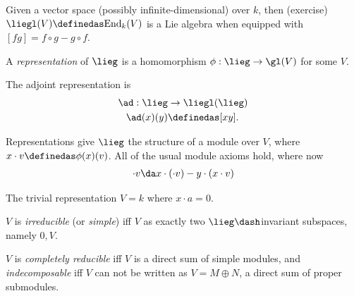 \begin{exercise}[?]

Given a vector space (possibly infinite-dimensional) over \(k\), then
(exercise) \(\liegl(V) \definedas \mathrm{End}_k(V)\) is a Lie algebra
when equipped with \([f g] = f\circ g - g\circ f\).

\end{exercise}

\begin{definition}[Representation]

A \emph{representation} of \(\lieg\) is a homomorphism
\(\phi: \lieg \to \gl(V)\) for some \(V\).

\end{definition}

\begin{example}

The adjoint representation is
\begin{align*}  
\ad: \lieg &\to \liegl(\lieg) \\
\ad(x)(y) &\definedas [x y]
.\end{align*}

\end{example}

Representations give \(\lieg\) the structure of a module over \(V\),
where \(x\cdot v \definedas \phi(x)(v)\). All of the usual module axioms
hold, where now
\begin{align*}
[x y] \cdot v \da x\cdot(\cdot v) - y\cdot(x\cdot v)
\end{align*}

\begin{example}[?]

The trivial representation \(V = k\) where \(x\cdot a = 0\).

\end{example}

\begin{definition}[Irreducible]

\(V\) is \emph{irreducible} (or \emph{simple}) iff \(V\) as exactly two
\(\lieg\dash\)invariant subspaces, namely \(0, V\).

\end{definition}

\begin{definition}

\(V\) is \emph{completely reducible} iff \(V\) is a direct sum of simple
modules, and \emph{indecomposable} iff \(V\) can not be written as
\(V = M \oplus N\), a direct sum of proper submodules.

\end{definition}

